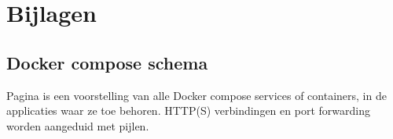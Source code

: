\documentclass[a4paper, 12pt]{report}
\begin{document}
\chapter*{Bijlagen}

\section*{Docker compose schema}
Pagina \pageref{bijlage:aangepast-systeem-schema-docker} is een voorstelling van alle Docker compose services of containers, in de applicaties waar ze toe behoren.
HTTP(S) verbindingen en port forwarding worden aangeduid met pijlen.



\printbibliography
{}

\newpage
\thispagestyle{empty}
\mbox{}

\newpage
\thispagestyle{empty}
\mbox{}
\end{document}
